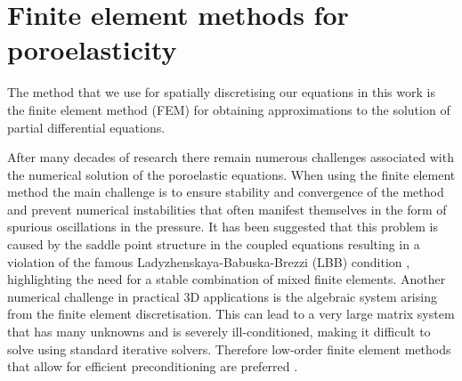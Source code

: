 \section{Finite element methods for poroelasticity}
The method that we use for spatially discretising our equations in this work is the finite element method (FEM) for obtaining approximations to the solution of partial differential equations.

After many decades of research there remain numerous challenges associated with the numerical solution of the poroelastic equations. When using the finite element method the main challenge is to ensure stability and convergence of the method and prevent numerical instabilities that often manifest themselves in the form of spurious oscillations in the pressure. It has been suggested that this problem is caused by the saddle point structure in the coupled equations resulting in a violation of the famous Ladyzhenskaya-Babuska-Brezzi (LBB) condition \citep{haga2012causes}, highlighting the need for a stable combination of mixed finite elements. Another numerical challenge in practical 3D applications is the algebraic system arising from the finite element discretisation. This can lead to a very large matrix system that has many unknowns and is severely ill-conditioned, making it difficult to solve using standard iterative solvers. Therefore low-order finite element methods that allow for efficient preconditioning are preferred \citep{white2011block,ferronato2010fully}.

